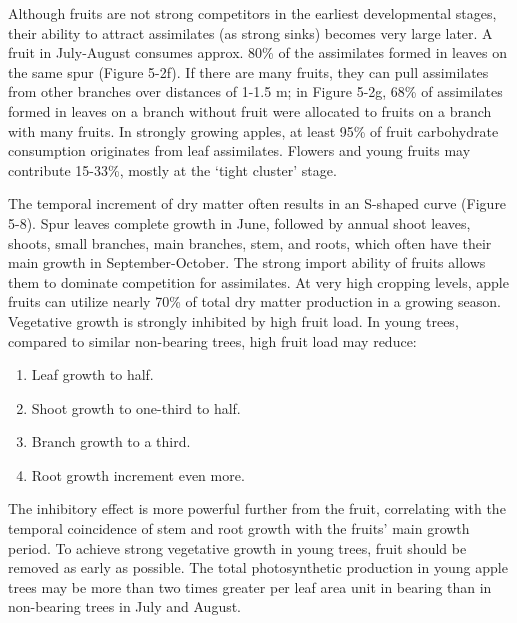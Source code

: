 \vspace{0.5em}
Although fruits are not strong competitors in the earliest developmental stages, their ability to attract assimilates (as strong sinks) becomes very large later. A fruit in July-August consumes approx. 80\% of the assimilates formed in leaves on the same spur (Figure 5-2f). If there are many fruits, they can pull assimilates from other branches over distances of 1-1.5 m; in Figure 5-2g, 68\% of assimilates formed in leaves on a branch without fruit were allocated to fruits on a branch with many fruits. In strongly growing apples, at least 95\% of fruit carbohydrate consumption originates from leaf assimilates. Flowers and young fruits may contribute 15-33\%, mostly at the ‘tight cluster’ stage.

\vspace{0.5em}
The temporal increment of dry matter often results in an S-shaped curve (Figure 5-8). Spur leaves complete growth in June, followed by annual shoot leaves, shoots, small branches, main branches, stem, and roots, which often have their main growth in September-October. The strong import ability of fruits allows them to dominate competition for assimilates. At very high cropping levels, apple fruits can utilize nearly 70\% of total dry matter production in a growing season. Vegetative growth is strongly inhibited by high fruit load. In young trees, compared to similar non-bearing trees, high fruit load may reduce: 

\begin{enumerate} 
    \item Leaf growth to half. 
    \item Shoot growth to one-third to half. 
    \item Branch growth to a third. 
    \item Root growth increment even more. 
\end{enumerate} 

\vspace{0.5em}
The inhibitory effect is more powerful further from the fruit, correlating with the temporal coincidence of stem and root growth with the fruits' main growth period. To achieve strong vegetative growth in young trees, fruit should be removed as early as possible. The total photosynthetic production in young apple trees may be more than two times greater per leaf area unit in bearing than in non-bearing trees in July and August.

